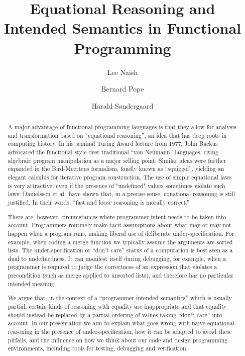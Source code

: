 \documentclass{llncs}
\begin{document}
\title%
{Equational Reasoning and Intended Semantics in Functional Programming}
\pagestyle{plain}

\author{Lee Naish \and 
Bernard Pope \and 
Harald S{\o}ndergaard
}


\maketitle

\begin{abstract}
A major advantage of functional programming languages is that they 
allow for analysis and transformation based on ``equational reasoning'';
an idea that has deep roots in computing history. 
In his seminal Turing Award lecture from 1977, John Backus advocated 
the functional style over traditional ``von Neumann'' languages, 
citing algebraic program manipulation as a major selling point. 
Similar ideas were further expanded in the Bird-Meertens formalism, 
fondly known as ``squiggol'', yielding an elegant calculus for 
iterative program construction. 
The use of simple equational laws is very attractive, 
even if the presence of "undefined" values sometimes violate such laws: 
Danielsson et al.\ have shown that, in a precise sense, equational 
reasoning is still justified. 
In their words, ``fast and loose reasoning is morally correct.''

There are, however, circumstances where programmer intent needs to be 
taken into account. 
Programmers routinely make tacit assumptions about what may or may 
not happen when a program runs, making liberal use of deliberate 
under-specification. 
For example, when coding a merge function we typically assume the 
arguments are sorted lists. 
The under-specification or ``don't care'' status of a computation is 
best seen as a dual to undefinedness. 
It can manifest itself during debugging, for example, when a 
programmer is required to judge the correctness of an expression 
that violates a precondition (such as merge applied to unsorted lists),
and therefore has no particular intended meaning.

We argue that, in the context of a ``programmer-intended semantics'' 
which is usually partial, certain kinds of reasoning with equality 
are inappropriate and that equality should instead be replaced by a 
partial ordering of values taking ``don't care'' into account. 
In our presentation we aim to explain what goes wrong with naive 
equational reasoning in the presence of under-specification, 
how it can be adapted to avoid these pitfalls, and the influence 
on how we think about our code and design programming environments, 
including tools for testing, debugging and verification.
\end{abstract}
\end{document}
